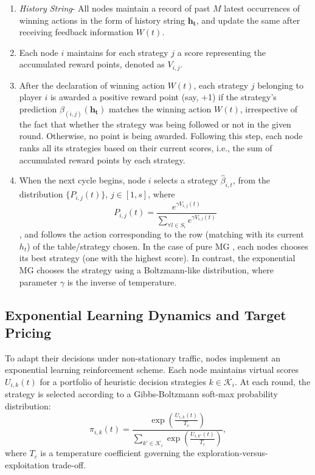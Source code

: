 \begin{enumerate}
\item \textit{History String}- All nodes maintain a record of past
$M$ latest occurrences of winning actions in the form of
history string $\mathbf{h_t}$, and update the same after receiving
feedback information $W(t)$.
\item Each node $i$ maintains for each strategy $j$ a score  representing the accumulated reward points, denoted as $V_{i,j}$.
\item After the declaration of winning action $W(t)$, each strategy $j$
belonging to player $i$ is awarded a positive reward point
(say, +1) if the strategy’s prediction $\beta_{(i,j)}(\mathbf{h_t})$
matches the winning
action $W(t)$, irrespective of the fact that whether the strategy
was being followed or not in the given round. Otherwise,
no point is being awarded. 
Following this step, each node
ranks all its strategies based on their current scores, i.e.,
the sum of accumulated reward points by each strategy.
\item When the next cycle begins, node $i$
selects 
 a strategy ${\hat{\beta}}_{i,t}$, from the distribution $\{P_{i,j}(t)\}$, $j\in[1,s]$, where 
 \begin{equation}
 P_{i,j}(t)=\frac{e^{{\gamma} V_{i,j}(t)}}{\sum_{\forall l\in S_i}^{} e^{{\gamma} V_{i,l}(t)}}
  \end{equation}
, and follows the action corresponding
to the row (matching with its current $h_t$) of the table/strategy chosen.
In the case of pure MG , each nodes chooses its best strategy (one with the highest score). In contrast, the exponential MG chooses the strategy using a Boltzmann-like distribution, where parameter $\gamma$ is the inverse of temperature.   
\end{enumerate}

\subsection{Exponential Learning Dynamics and Target Pricing}
To adapt their decisions under non-stationary traffic, nodes implement an exponential learning reinforcement scheme. Each node maintains virtual scores $U_{i, k}(t)$ for a portfolio of heuristic decision strategies $k \in \mathcal{K}_i$. At each round, the strategy is selected according to a Gibbs-Boltzmann soft-max probability distribution:
\begin{equation}
    \pi_{i, k}(t) = \frac{\exp\left( \frac{U_{i, k}(t)}{T_c} \right)}{\sum_{k' \in \mathcal{K}_i} \exp\left( \frac{U_{i, k'}(t)}{T_c} \right)},
\end{equation}
where $T_c$ is a temperature coefficient governing the exploration-versus-exploitation trade-off.

